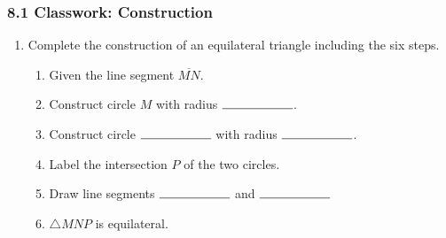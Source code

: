 

\fancyhead[LE]{\thepage}



\subsubsection*{8.1 Classwork: Construction}
\begin{enumerate}
\item Complete the construction of an equilateral triangle including the six steps.
\begin{enumerate}
  \item Given the line segment $\overline{MN}$.
  \bigskip
  \item Construct circle $M$ with radius $\rule{2cm}{0.15mm}$.
  \bigskip
  \item Construct circle $\rule{2cm}{0.15mm}$  with radius $\rule{2cm}{0.15mm}$. \bigskip
  \item Label the intersection $P$ of the two circles.
  \bigskip
  \item Draw line segments $\rule{2cm}{0.15mm}$  and $\rule{2cm}{0.15mm}$
  \bigskip
  \item $\triangle MNP$ is equilateral.
\end{enumerate}
\vspace{7cm}
\begin{center}
\end{center}


\end{enumerate}

